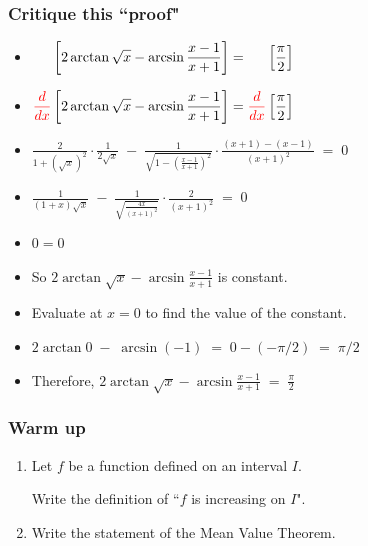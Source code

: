 \documentclass[14pt]{beamer}
\newcommand{\rojo}[1]{{\color{red} #1}}
\newcommand{\setsize}[1]{\fontsize{#1}{#1}\selectfont} %
\begin{document}
	\begin{frame}[t]
		\setsize{12}
		\frametitle{Critique this ``proof"}
		\begin{itemize}
			\item $\displaystyle  \phantom{\rojo{\frac{d}{dx}}} \left[ 2 \arctan
				\sqrt{x} - \arcsin \frac{x-1}{x+1} \right] =
				\phantom{\rojo{\frac{d}{dx}}} \left[ \frac{\pi}{2} \right] $

			\item $\displaystyle  \rojo{\frac{d}{dx}} \left[ 2 \arctan \sqrt{x} -
				\arcsin \frac{x-1}{x+1} \right] = \rojo{\frac{d}{dx}} \left[
				\frac{\pi}{2} \right] $

			\item $\displaystyle \frac{2}{1+ \left( \sqrt{x}\right)^{2}} \cdot \frac{1}{2\sqrt{x}}
				\; - \; \frac{1}{\sqrt{1- \left( \frac{x-1}{x+1}\right)^{2}}} \cdot \frac{(x+1)
				- (x-1)}{(x+1)^{2}} \; = \; 0$

			\item $\displaystyle \frac{1}{(1+ x)\sqrt{x} } \; - \; \frac{1}{ \sqrt{\frac{4x}{(x+1)^{2}}
				}} \cdot \frac{2}{(x+1)^{2}} \; = \; 0$

			\item $\displaystyle 0 = 0$

			\item So $\displaystyle  2 \arctan \sqrt{x} - \arcsin \frac{x-1}{x+1} $ is
				constant.

			\item Evaluate at $x=0$ to find the value of the constant.

			\item $\displaystyle 2 \arctan 0 \; - \; \arcsin (-1) \; = \; 0 - \left( -
				\pi/2 \right) \; = \; \pi/2 $

			\item Therefore, \;
				$\displaystyle 2 \arctan \sqrt{x} - \arcsin \frac{x-1}{x+1} \; = \; \frac{\pi}{2}$
		\end{itemize}
	\end{frame}
	\begin{frame}[t]
		\frametitle{Warm up}

		\begin{enumerate}
			\item Let $f$ be a function defined on an interval $I$.

				Write the definition of ``$f$ is increasing on $I$".

				\medskip


			\item Write the statement of the Mean Value Theorem.
		\end{enumerate}
	\end{frame}
\end{document}
